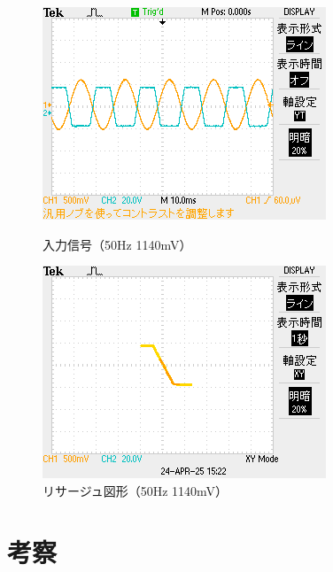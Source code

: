 \documentclass{jlreq}
\numberwithin{equation}{section}
\begin{document}
\begin{figure}[H]
  \centering
  \begin{minipage}{0.45\textwidth}
    \centering
    \includegraphics[width=\textwidth]{clip_1140mV_YT.png}
    \caption{入力信号（50Hz 1140mV）}
  \end{minipage}
  \hfill
  \begin{minipage}{0.45\textwidth}
    \centering
    \includegraphics[width=\textwidth]{clip_1140mV_XY.png}
    \caption{リサージュ図形（50Hz 1140mV）}
  \end{minipage}
\end{figure}

\section{考察}
\end{document}
